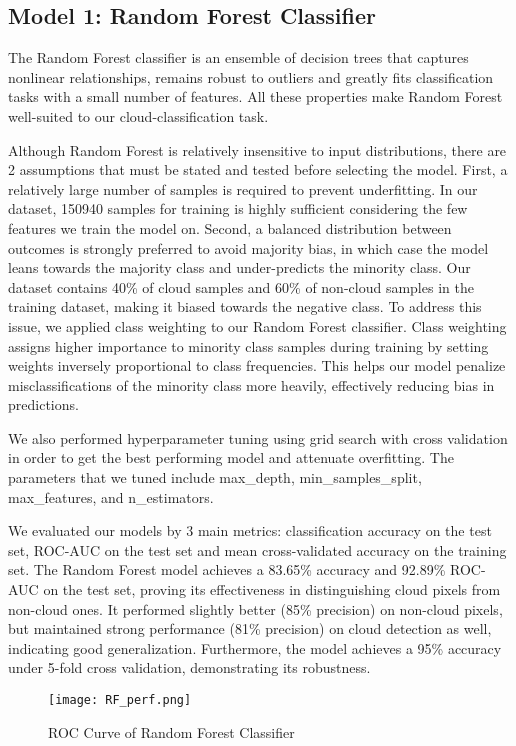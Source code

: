 \documentclass[10pt,letterpaper]{article}
\begin{document}
\subsection{Model 1: Random Forest Classifier}
The Random Forest classifier is an ensemble of decision trees that captures nonlinear relationships, remains robust to outliers and greatly fits classification tasks with a small number of features. All these properties make Random Forest well-suited to our cloud-classification task.

Although Random Forest is relatively insensitive to input distributions, there are 2 assumptions that must be stated and tested before selecting the model. First, a relatively large number of samples is required to prevent underfitting. In our dataset, 150940 samples for training is highly sufficient considering the few features we train the model on. Second, a balanced distribution between outcomes is strongly preferred to avoid majority bias, in which case the model leans towards the majority class and under-predicts the minority class. Our dataset contains 40\% of cloud samples and 60\% of non-cloud samples in the training dataset, making it biased towards the negative class. To address this issue, we applied class weighting to our Random Forest classifier. Class weighting assigns higher importance to minority class samples during training by setting weights inversely proportional to class frequencies. This helps our model penalize misclassifications of the minority class more heavily, effectively reducing bias in predictions. 

We also performed hyperparameter tuning using grid search with cross validation in order to get the best performing model and attenuate overfitting. The parameters that we tuned include max\_depth, min\_samples\_split, max\_features, and n\_estimators.

We evaluated our models by 3 main metrics: classification accuracy on the test set, ROC-AUC on the test set and mean cross-validated accuracy on the training set. The Random Forest model achieves a 83.65\% accuracy and 92.89\% ROC-AUC on the test set, proving its effectiveness in distinguishing cloud pixels from non-cloud ones.  It performed slightly better (85\% precision) on non-cloud pixels, but maintained strong performance (81\% precision) on cloud detection as well, indicating good generalization. Furthermore, the model achieves a 95\% accuracy under 5-fold cross validation, demonstrating its robustness.

\begin{figure}[H]
    \centering
    \texttt{[image: RF\_perf.png]}
    \caption{ROC Curve of Random Forest Classifier}
    \label{fig:enter-label}
\end{figure}
\end{document}
